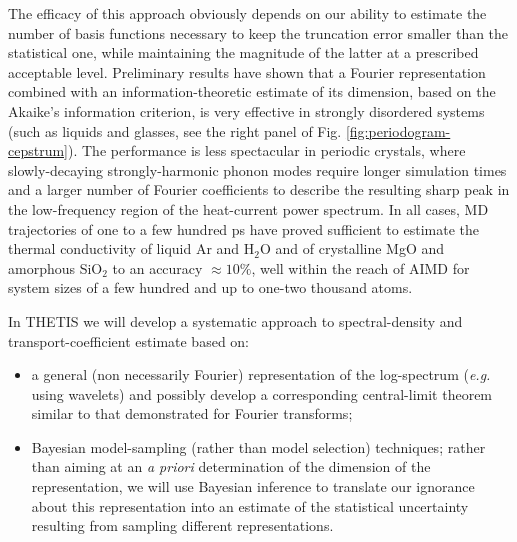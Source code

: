 The efficacy of this approach obviously depends on our ability to estimate the number of basis functions necessary to keep the truncation error smaller than the statistical one, while maintaining the magnitude of the latter at a prescribed acceptable level. Preliminary results have shown that a Fourier representation combined with an information-theoretic estimate of its dimension, based on the Akaike's information criterion,\cite{Akaike1973,H.Akaike1974} is very effective in strongly disordered systems (such as liquids and glasses, see the right panel of Fig. \ref{fig:periodogram-cepstrum}).
The performance is less spectacular in periodic crystals, where slowly-decaying strongly-harmonic phonon modes require longer simulation times and a larger number of Fourier coefficients to describe the resulting sharp peak in the low-frequency region of the heat-current power spectrum. In all cases, MD trajectories of one to a few hundred ps have proved sufficient to estimate the thermal conductivity of liquid Ar and H$_2$O and of crystalline MgO and amorphous SiO$_2$ to an accuracy $\approx 10\%$,\cite{Ercole2017} well within the reach of AIMD for system sizes of a few hundred and up to one-two thousand atoms.

\noindent In THETIS we will develop a systematic approach to spectral-density and transport-coefficient estimate based on:
\begin{itemize}
\item  a general (non necessarily Fourier) representation of the log-spectrum (\emph{e.g.} using wavelets) and possibly develop a corresponding central-limit theorem similar to that demonstrated for Fourier transforms;\cite{Anderson1971,Peligrad2010} 
\item Bayesian model-sampling (rather than model selection) techniques;\cite{Claeskens2008} rather than aiming at an \emph{a priori} determination of the dimension of the representation, we will use Bayesian inference to translate our ignorance about this representation into an estimate of the statistical uncertainty resulting from sampling different representations.
\end{itemize}


